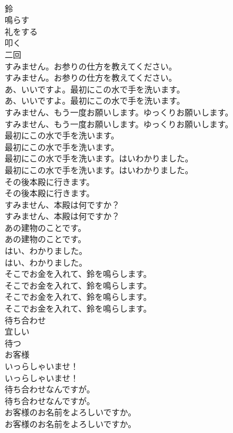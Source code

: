 \documentclass[8pt]{extreport}
\begin{document}
\begin{CJK}{UTF8}{min}
\\	鈴
\\	鳴らす
\\	礼をする
\\	叩く
\\	二回
\\	すみません。お参りの仕方を教えてください。	
\\	すみません。お参りの仕方を教えてください。 
\\	あ、いいですよ。最初にこの水で手を洗います。	
\\	あ、いいですよ。最初にこの水で手を洗います。 
\\	すみません、もう一度お願いします。ゆっくりお願いします。	
\\	すみません、もう一度お願いします。ゆっくりお願いします。 
\\	最初にこの水で手を洗います。	
\\	最初にこの水で手を洗います。 
\\	最初にこの水で手を洗います。はいわかりました。	
\\	最初にこの水で手を洗います。はいわかりました。 
\\	その後本殿に行きます。	
\\	その後本殿に行きます。 
\\	すみません、本殿は何ですか？	
\\	すみません、本殿は何ですか？ 
\\	あの建物のことです。	
\\	あの建物のことです。 
\\	はい、わかりました。	
\\	はい、わかりました。 
\\	そこでお金を入れて、鈴を鳴らします。	
\\	そこでお金を入れて、鈴を鳴らします。 
\\	そこでお金を入れて、鈴を鳴らします。	
\\	そこでお金を入れて、鈴を鳴らします。 
\\	待ち合わせ
\\	宜しい
\\	待つ
\\	お客様
\\	いっらしゃいませ！	
\\	いっらしゃいませ！ 
\\	待ち合わせなんですが。	
\\	待ち合わせなんですが。 
\\	お客様のお名前をよろしいですか。	
\\	お客様のお名前をよろしいですか。 

\end{CJK}
\end{document}
